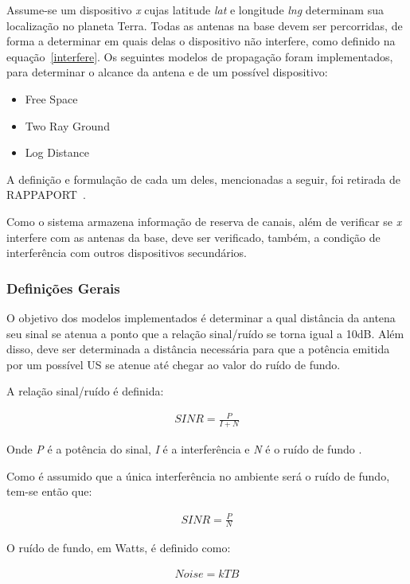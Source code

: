 Assume-se um dispositivo \textit{x} cujas latitude \textit{lat} e longitude \textit{lng} determinam sua localização no planeta Terra. Todas as antenas na base devem ser percorridas, de forma a determinar em quais delas o dispositivo não interfere, como definido na equação~\ref{interfere}. Os seguintes modelos de propagação foram implementados, para determinar o alcance da antena e de um possível dispositivo:

\begin{itemize}
\item Free Space
\item Two Ray Ground
\item Log Distance
\end{itemize}

A definição e formulação de cada um deles, mencionadas a seguir, foi retirada de RAPPAPORT~\cite{rapapport}.

Como o sistema armazena informação de reserva de canais, além de verificar se \textit{x} interfere com as antenas da base,  deve ser verificado, também, a condição de interferência com outros dispositivos secundários.

\subsubsection{Definições Gerais}

O objetivo dos modelos implementados é determinar a qual distância da antena seu sinal se atenua a ponto que a relação sinal/ruído se torna igual a 10dB. Além disso, deve ser determinada a distância necessária para que a potência emitida por um possível US se atenue até chegar ao valor do ruído de fundo.

A relação sinal/ruído é definida:

\begin{align}
  \label{Sinr} SINR=\frac{P}{I+N}
\end{align}

Onde \textit{P} é a potência do sinal, \textit{I} é a interferência e \textit{N} é o ruído de fundo .

Como é assumido que a única interferência no ambiente será o ruído de fundo, tem-se então que:

\begin{align}
  \label{actSinr} SINR=\frac{P}{N}
\end{align}

O ruído de fundo, em Watts, é definido como:

\begin{align}
  \label{noise} Noise=kTB
\end{align}

